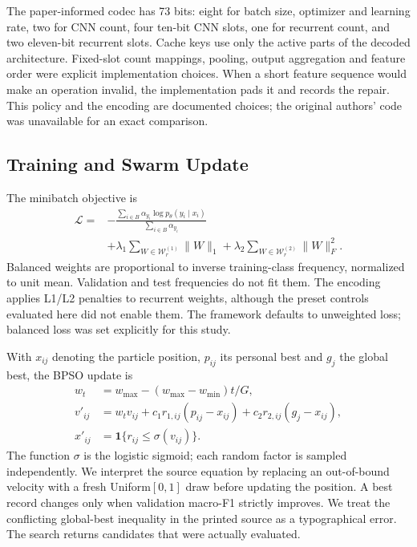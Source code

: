 The paper-informed codec has 73 bits: eight for batch size, optimizer and learning rate, two for CNN count, four ten-bit CNN slots, one for recurrent count, and two eleven-bit recurrent slots. Cache keys use only the active parts of the decoded architecture. Fixed-slot count mappings, pooling, output aggregation and feature order were explicit implementation choices. When a short feature sequence would make an operation invalid, the implementation pads it and records the repair. This policy and the encoding are documented choices; the original authors' code was unavailable for an exact comparison.

\subsection{Training and Swarm Update}
The minibatch objective is
\begin{equation}\begin{split}
 \mathcal L={}&-\frac{\sum_{i\in B}\alpha_{y_i}\log p_\theta(y_i\mid x_i)}{\sum_{i\in B}\alpha_{y_i}}\\
 &+\lambda_1\!\sum_{W\in\mathcal W_r^{(1)}}\|W\|_1
 +\lambda_2\!\sum_{W\in\mathcal W_r^{(2)}}\|W\|_F^2.
\end{split}\end{equation}
Balanced weights are proportional to inverse training-class frequency, normalized to unit mean. Validation and test frequencies do not fit them. The encoding applies L1/L2 penalties to recurrent weights, although the preset controls evaluated here did not enable them. The framework defaults to unweighted loss; balanced loss was set explicitly for this study.

With $x_{ij}$ denoting the particle position, $p_{ij}$ its personal best and $g_j$ the global best, the BPSO update is
\begin{align}
 w_t&=w_{\max}-(w_{\max}-w_{\min})t/G,\\
 v'_{ij}&=w_tv_{ij}+c_1r_{1,ij}(p_{ij}-x_{ij})+c_2r_{2,ij}(g_j-x_{ij}),\\
 x'_{ij}&=\mathbf{1}\{r_{ij}\leq\sigma(v_{ij})\}.
\end{align}
The function $\sigma$ is the logistic sigmoid; each random factor is sampled independently. We interpret the source equation by replacing an out-of-bound velocity with a fresh Uniform$[0,1]$ draw before updating the position. A best record changes only when validation macro-F1 strictly improves. We treat the conflicting global-best inequality in the printed source as a typographical error. The search returns candidates that were actually evaluated.

